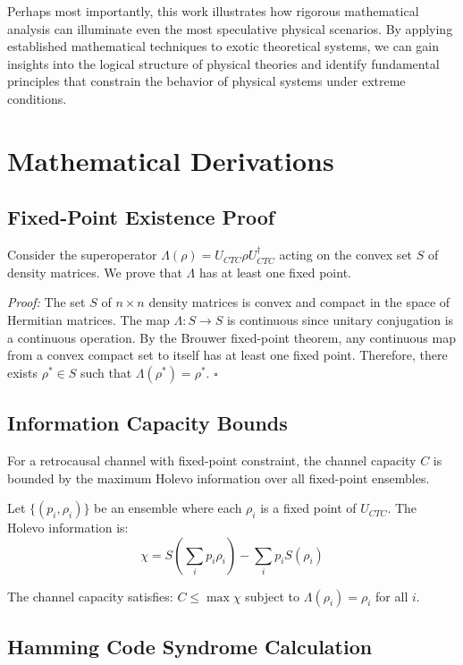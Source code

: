 \documentclass[12pt,a4paper]{article}
\begin{document}
Perhaps most importantly, this work illustrates how rigorous mathematical analysis can illuminate even the most speculative physical scenarios. By applying established mathematical techniques to exotic theoretical systems, we can gain insights into the logical structure of physical theories and identify fundamental principles that constrain the behavior of physical systems under extreme conditions.

\appendix

\section{Mathematical Derivations}

\subsection{Fixed-Point Existence Proof}

Consider the superoperator $\Lambda(\rho) = U_{CTC} \rho U_{CTC}^\dagger$ acting on the convex set $S$ of density matrices. We prove that $\Lambda$ has at least one fixed point.

\textit{Proof:} The set $S$ of $n \times n$ density matrices is convex and compact in the space of Hermitian matrices. The map $\Lambda: S \rightarrow S$ is continuous since unitary conjugation is a continuous operation. By the Brouwer fixed-point theorem, any continuous map from a convex compact set to itself has at least one fixed point. Therefore, there exists $\rho^* \in S$ such that $\Lambda(\rho^*) = \rho^*$. $\square$

\subsection{Information Capacity Bounds}

For a retrocausal channel with fixed-point constraint, the channel capacity $C$ is bounded by the maximum Holevo information over all fixed-point ensembles.

Let $\{(p_i, \rho_i)\}$ be an ensemble where each $\rho_i$ is a fixed point of $U_{CTC}$. The Holevo information is:
\begin{equation}
\chi = S\left(\sum_i p_i \rho_i\right) - \sum_i p_i S(\rho_i)
\end{equation}

The channel capacity satisfies: $C \leq \max \chi$ subject to $\Lambda(\rho_i) = \rho_i$ for all $i$.

\subsection{Hamming Code Syndrome Calculation}
\end{document}
